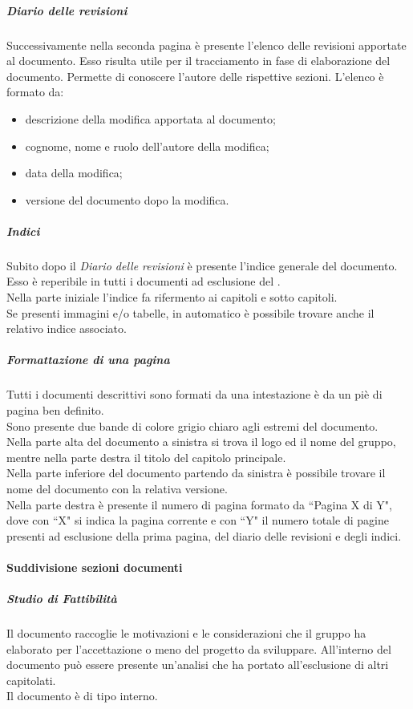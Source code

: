 				\subparagraph{Diario delle revisioni}
				Successivamente nella seconda pagina è presente l'elenco delle revisioni apportate al documento. Esso risulta utile per il tracciamento in fase di elaborazione del documento. Permette di conoscere l'autore delle rispettive sezioni. L'elenco è formato da:
				\begin{itemize}
					\item descrizione della modifica apportata al documento;
					\item cognome, nome e ruolo dell'autore della modifica;
					\item data della modifica;
					\item versione del documento dopo la modifica.
				\end{itemize}

				\subparagraph{Indici}
				Subito dopo il \emph{Diario delle revisioni} è presente l'indice generale del documento. Esso è reperibile in tutti i documenti ad esclusione del \docGlossary.\\
				Nella parte iniziale l'indice fa rifermento ai capitoli e sotto capitoli.\\
				Se presenti immagini e/o tabelle, in automatico è possibile trovare anche il relativo indice associato.

				\subparagraph{Formattazione di una pagina}
				Tutti i documenti descrittivi sono formati da una intestazione è da un piè di pagina ben definito.\\
				Sono presente due bande di colore grigio chiaro agli estremi del documento.\\
				Nella parte alta del documento a sinistra si trova il logo ed il nome del gruppo, mentre nella parte destra il titolo del capitolo principale.\\
				Nella parte inferiore del documento partendo da sinistra è possibile trovare il nome del documento con la relativa versione.\\
				Nella parte destra è presente il numero di pagina formato da ``Pagina X di Y", dove con ``X" si indica la pagina corrente e con ``Y" il numero totale di pagine presenti ad esclusione della prima pagina, del diario delle revisioni e degli indici.

			\paragraph{Suddivisione sezioni documenti}

				\subparagraph{Studio di Fattibilità} Il documento raccoglie le motivazioni e le considerazioni che il gruppo ha elaborato per l'accettazione o meno del progetto da sviluppare. All'interno del documento può essere presente un'analisi che ha portato all'esclusione di altri capitolati.\\
				Il documento è di tipo interno.

